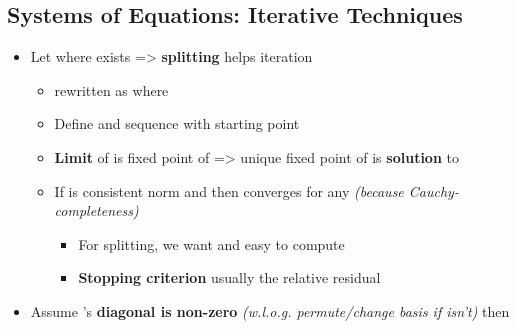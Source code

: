 \subsection*{Systems of Equations: Iterative
  Techniques}

\begin{itemize}

  \item
        Let  where 
        exists =\textgreater{} \textbf{splitting}  helps
        iteration

        \begin{itemize}

          \item
                 rewritten as
                 where
          \item
                Define  and
                sequence
                with starting point 
          \item
                \textbf{Limit} of  is fixed
                point of  =\textgreater{} unique fixed point of 
                is \textbf{solution} to 
          \item
                If \iMbox{\lVert - \rVert} is consistent norm and
                 then
                 converges for any
                 \emph{(because Cauchy-completeness)}

                \begin{itemize}

                  \item
                        For splitting, we want  and easy to
                        compute 
                  \item
                        \textbf{Stopping criterion} usually the relative residual
                \end{itemize}
        \end{itemize}
  \item
        Assume 's \textbf{diagonal is non-zero} \emph{(w.l.o.g.
          permute/change basis if isn't)} then 


\end{itemize}
